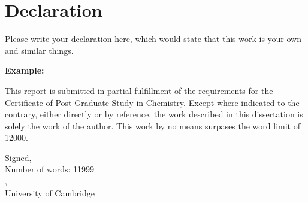 %
\chapter*{Declaration}

\noindent
Please write your declaration here, which would state that this work is your own
and similar things.

\textbf{Example:}

This report is submitted in partial fulfillment of the requirements for the
Certificate of Post-Graduate Study in Chemistry. Except where indicated to the
contrary, either directly or by reference, the work described in this
dissertation is solely the work of the author. This work by no means surpases
the word limit of 12000.



\begin{flushright}
    \vspace{2cm}
    Signed,\hspace{3cm}$\,$\\
    \vspace{2cm}
    Number of words: 11999 \\ %
    \makeatletter
    \@author,\\
    \makeatother
    University of Cambridge
\end{flushright}

